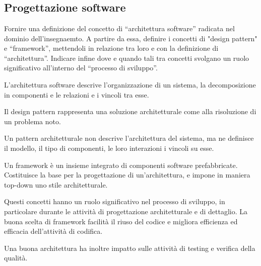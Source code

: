 \section{}

\subsection{Progettazione software}

\begin{question}
  Fornire una definizione del concetto di ``architettura software'' radicata nel
  dominio dell'insegnaemto. A partire da essa, definire i concetti di "design
  pattern" e ``framework'', mettendoli in relazione tra loro e con la
  definizione di ``architettura''. Indicare infine dove e quando tali tra concetti
  svolgano un ruolo significativo all'interno del ``processo di sviluppo''.
\end{question}

L'architettura software descrive l'organizzazione di un sistema, la
decomposizione in componenti e le relazioni e i vincoli tra esse.

Il design pattern rappresenta una soluzione architetturale come
 alla risoluzione di un problema noto.

Un pattern architetturale non descrive l'architettura del sistema, ma ne
definisce il modello, il tipo di componenti, le loro interazioni i vincoli su
esse.

Un framework è un insieme integrato di componenti software prefabbricate.
Costituisce la base per la progettazione  di
un'architettura, e impone in maniera top-down uno stile architetturale.

Questi concetti hanno un ruolo significativo nel processo di sviluppo, in
particolare durante le attività di progettazione architetturale e di dettaglio.
La buona scelta di framework facilità il riuso del codice e migliora
efficienza ed efficacia dell'attività di codifica.

Una buona architettura ha inoltre impatto sulle attività di testing e verifica
della qualità.

